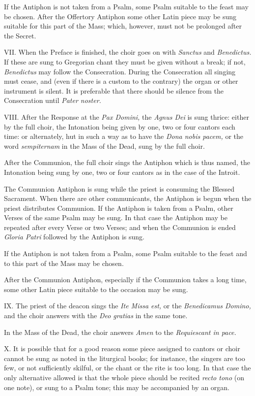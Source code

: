 If the Antiphon is not taken from a Psalm, some Psalm suitable to the feast may be chosen. After the Offertory Antiphon some other Latin piece may be sung suitable for this part of the Mass; which, however, must not be prolonged after the Secret.

VII. \quad When the Preface is finished, the choir goes on with {\it Sanctus} and {\it Benedictus.} If these are sung to Gregorian chant they must be given without a break; if not, {\it Benedictus} may follow the Consecration. During the Consecration all singing must cease, and (even if there is a custom to the contrary) the organ or other instrument is silent. It is preferable that there should be silence from the Consecration until {\it Pater noster.}

VIII. \quad After the Response at the {\it Pax Domini,} the {\it Agnus Dei} is sung thrice: either by the full choir, the Intonation being given by one, two or four cantors each time: or alternately, hut in such a way as to have the {\it Dona nobis pacem,} or the word {\it sempiternam} in the Mass of the Dead, sung by the full choir.

After the Communion, the full choir sings the Antiphon which is thus named, the Intonation being sung by one, two or four cantors as in the case of the Introit.

The Communion Antiphon is sung while the priest is consuming the Blessed Sacrament. When there are other communicants, the Antiphon is begun when the priest distributes Communion. If the Antiphon is taken from a Psalm, other Verses of the same Psalm may be sung. In that case the Antiphon may be repeated after every Verse or two Verses; and when the Communion is ended {\it Gloria Patri} followed by the Antiphon is sung.

If the Antiphon is not taken from a Psalm, some Psalm suitable to the feast and to this part of the Mass may be chosen.

After the Communion Antiphon, especially if the Communion takes a long time, some other Latin piece suitable to the occasion may be sung.

IX. \quad The priest of the deacon sings the {\it Ite Missa est,} or the {\it Benedicamus Domino,} and the choir answers with the {\it Deo gratias} in the same tone.

In the Mass of the Dead, the choir answers {\it Amen} to the {\it Requiescant in pace.}

X. \quad It is possible that for a good reason some piece assigned to cantors or choir cannot be sung as noted in the liturgical books; for instance, the singers are too few, or not sufficiently skilful, or the chant or the rite is too long. In that case the only alternative allowed is that the whole piece should be recited {\it recto tono} (on one note), or sung to a Psalm tone; this may be accompanied by an organ.
